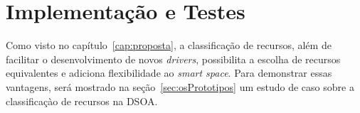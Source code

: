 \chapter{Implementação e Testes}

Como visto no capítulo~\ref{cap:proposta}, a classificação de recursos, além de facilitar o desenvolvimento de novos \emph{drivers}, possibilita a escolha de recursos equivalentes e adiciona flexibilidade ao \emph{smart space}. Para demonstrar essas vantagens, será mostrado na seção~\ref{sec:osPrototipos} um estudo de caso sobre a classificaçào de recursos na DSOA.



